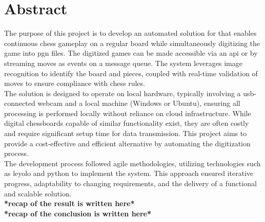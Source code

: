 \chapter*{Abstract}


The purpose of this project is to develop an automated solution for \aas that enables continuous chess gameplay on a regular board while simultaneously digitizing the game into \gls{pgn} files. The digitized games can be made accessible via an \gls{api} or by streaming moves as events on a message queue. The system leverages image recognition to identify the board and pieces, coupled with real-time validation of moves to ensure compliance with chess rules.\\

The solution is designed to operate on local hardware, typically involving a \acrshort{usb}-connected webcam and a local machine (Windows or Ubuntu), ensuring all processing is performed locally without reliance on cloud infrastructure. While digital chessboards capable of similar functionality exist, they are often costly and require significant setup time for data transmission. This project aims to provide a cost-effective and efficient alternative by automating the digitization process.\\

The development process followed \gls{agile} methodologies, utilizing technologies such as \gls{leyolo} and \gls{python} to implement the system. This approach ensured iterative progress, adaptability to changing requirements, and the delivery of a functional and scalable solution.\\

\textbf{*recap of the result is written here*}\\

\textbf{*recap of the conclusion is written here*}